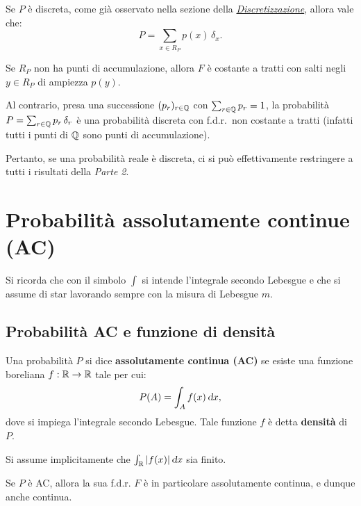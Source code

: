 \begin{multicols*}{2}
\begin{remark}
    Se $P$ è discreta, come già osservato nella sezione della \textit{\hyperref[remark:identità_discreta_dirac]{Discretizzazione}},
    allora vale che:
    \[
        P = \sum_{x \in R_P} p(x) \, \delta_x.
    \]
\end{remark}

\begin{remark}
    Se $R_P$ non ha punti di accumulazione, allora $F$ è costante a tratti con salti
    negli $y \in R_P$ di ampiezza $p(y)$. \smallskip


    Al contrario, presa una successione $(p_r)_{r \in \mathbb{Q}}$ con $\sum_{r \in \mathbb{Q}} p_r = 1$,
    la probabilità $P = \sum_{r \in \mathbb{Q}} p_r \, \delta_r$ è una probabilità discreta con
    f.d.r.~non costante a tratti (infatti tutti i punti di $\mathbb{Q}$ sono punti di accumulazione). 
\end{remark}

Pertanto, se una probabilità reale è discreta, ci si può effettivamente restringere a tutti
i risultati della \textit{Parte 2}.

\section{Probabilità assolutamente continue (AC)}

\begin{warn}
    Si ricorda che con il simbolo $\int$ si intende l'integrale
    secondo Lebesgue e che si assume di star lavorando sempre con la
    misura di Lebesgue $m$.
\end{warn}

\subsection{Probabilità AC e funzione di densità}

\begin{definition}
    Una probabilità $P$ si dice \textbf{assolutamente continua (AC)}
    se esiste una funzione
    boreliana $f : \mathbb{R} \to \mathbb{R}$ tale per cui:
    \[
        P(A) = \int_A f(x) \dx,
    \]
    dove si impiega l'integrale secondo Lebesgue. Tale funzione $f$ è
    detta \textbf{densità} di $P$. \smallskip


    Si assume implicitamente che $\int_\RR \abs{f(x)} \dx$ sia finito.
\end{definition}

\begin{remark}
    Se $P$ è AC, allora la sua f.d.r. $F$ è in particolare
    assolutamente continua, e dunque anche continua.
\end{remark}


\end{multicols*}
